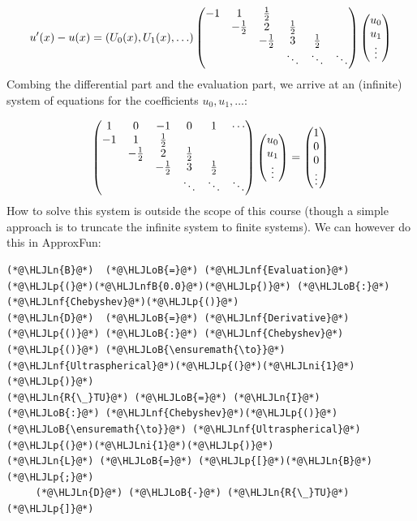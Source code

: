 \documentclass[12pt,a4paper]{article}
\newcommand{\HLJLn}[1]{#1}
\newcommand{\HLJLnf}[1]{\textcolor[RGB]{66,102,213}{#1}}
\newcommand{\HLJLnfB}[1]{\textcolor[RGB]{59,151,46}{#1}}
\newcommand{\HLJLni}[1]{\textcolor[RGB]{59,151,46}{#1}}
\newcommand{\HLJLoB}[1]{\textcolor[RGB]{102,102,102}{\textbf{#1}}}
\newcommand{\HLJLp}[1]{#1}
\def\half{ {1 \over 2} }
\begin{document}
\[
u'(x) - u(x) =  (U_0(x),U_1(x),\ldots)  \begin{pmatrix}
    -1 &1 & \half \cr 
& -\half & 2 & \half \cr
&& -\half & 3 & \half \cr
&&&\ddots & \ddots & \ddots
\end{pmatrix} \begin{pmatrix} u_0\\u_1\\\vdots \end{pmatrix} 
\]
Combing the differential part and the evaluation part, we arrive at an (infinite) system of equations for the coefficients $u_0,u_1,\dots$:

\[
\begin{pmatrix}
      1 & 0 & -1 & 0 & 1 & \cdots \\
    -1 &1 & \half \cr 
& -\half & 2 & \half \cr
&& -\half & 3 & \half \cr
&&&\ddots & \ddots & \ddots
\end{pmatrix} \begin{pmatrix} u_0\\u_1\\\vdots \end{pmatrix}  = \begin{pmatrix} 1 \\ 0 \\ 0 \\ \vdots \end{pmatrix}
\]
How to solve this system is outside the scope of this course (though a simple approach is to truncate the infinite system to finite systems). We can however do this in ApproxFun:


\begin{lstlisting}
(*@\HLJLn{B}@*)  (*@\HLJLoB{=}@*) (*@\HLJLnf{Evaluation}@*)(*@\HLJLp{(}@*)(*@\HLJLnfB{0.0}@*)(*@\HLJLp{)}@*) (*@\HLJLoB{:}@*) (*@\HLJLnf{Chebyshev}@*)(*@\HLJLp{()}@*)
(*@\HLJLn{D}@*)  (*@\HLJLoB{=}@*) (*@\HLJLnf{Derivative}@*)(*@\HLJLp{()}@*) (*@\HLJLoB{:}@*) (*@\HLJLnf{Chebyshev}@*)(*@\HLJLp{()}@*) (*@\HLJLoB{\ensuremath{\to}}@*) (*@\HLJLnf{Ultraspherical}@*)(*@\HLJLp{(}@*)(*@\HLJLni{1}@*)(*@\HLJLp{)}@*)
(*@\HLJLn{R{\_}TU}@*) (*@\HLJLoB{=}@*) (*@\HLJLn{I}@*) (*@\HLJLoB{:}@*) (*@\HLJLnf{Chebyshev}@*)(*@\HLJLp{()}@*) (*@\HLJLoB{\ensuremath{\to}}@*) (*@\HLJLnf{Ultraspherical}@*)(*@\HLJLp{(}@*)(*@\HLJLni{1}@*)(*@\HLJLp{)}@*)
(*@\HLJLn{L}@*) (*@\HLJLoB{=}@*) (*@\HLJLp{[}@*)(*@\HLJLn{B}@*)(*@\HLJLp{;}@*) 
     (*@\HLJLn{D}@*) (*@\HLJLoB{-}@*) (*@\HLJLn{R{\_}TU}@*)(*@\HLJLp{]}@*)
\end{lstlisting}
\end{document}

